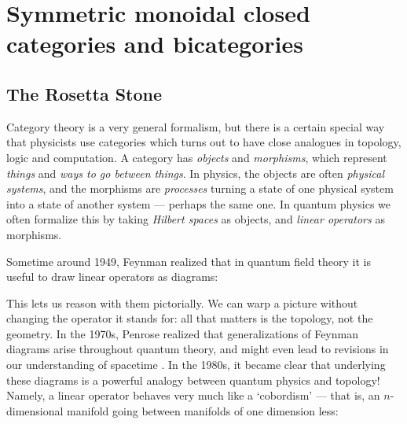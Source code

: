 \documentclass[12pt,twoside,openright]{report}
\begin{document}
\setcounter{chapter}{0}
\part{Symmetric monoidal closed categories and bicategories}
\chapter{The Rosetta Stone}

Category theory is a very general formalism, but there is a certain special way that physicists use categories which turns out to have close analogues in topology, logic and computation.  A category has
\emph{objects} and \emph{morphisms}, which represent \emph{things} and
\emph{ways to go between things}.  In physics, the objects are often 
\emph{physical systems}, and the morphisms are \emph{processes} turning a state of one physical system into a state of another system ---
perhaps the same one.  In quantum physics we often formalize this by taking \emph{Hilbert spaces} as objects, and \emph{linear operators}
as morphisms.

Sometime around 1949, Feynman \cite{Kaiser} realized that in quantum field theory it is useful to draw linear operators as diagrams: 
\begin{center}
\end{center}
\noindent This lets us reason with them pictorially.  We can warp a picture without changing the operator it stands for: all that matters is the topology, not the geometry.  In the 1970s, Penrose realized that generalizations of Feynman diagrams arise throughout quantum theory, and might even lead to revisions in our understanding of spacetime 
\cite{Penrose}.  In the 1980s, it became clear that underlying these diagrams is a powerful analogy between quantum physics and topology!  
Namely, a linear operator behaves very much like a `cobordism' ---
that is, an $n$-dimensional manifold going between manifolds of one dimension less:
\end{document}

